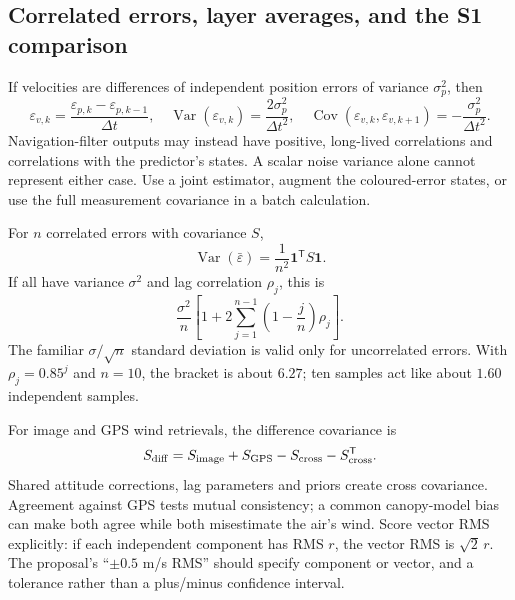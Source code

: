 \documentclass[11pt,a4paper]{article}
\numberwithin{equation}{section}
\begin{document}
\subsection{Correlated errors, layer averages, and the S1 comparison}
If velocities are differences of independent position errors of variance $\sigma_p^2$, then
\begin{equation}
 \varepsilon_{v,k}=\frac{\varepsilon_{p,k}-\varepsilon_{p,k-1}}{\Delta t},\quad
 \operatorname{Var}(\varepsilon_{v,k})=\frac{2\sigma_p^2}{\Delta t^2},\quad
 \operatorname{Cov}(\varepsilon_{v,k},\varepsilon_{v,k+1})=-\frac{\sigma_p^2}{\Delta t^2}.
\end{equation}
Navigation-filter outputs may instead have positive, long-lived correlations and correlations with the predictor's states. A scalar noise variance alone cannot represent either case. Use a joint estimator, augment the coloured-error states, or use the full measurement covariance in a batch calculation.

For $n$ correlated errors with covariance $S$,
\begin{equation}
 \operatorname{Var}(\bar\varepsilon)=\frac1{n^2}\mathbf1^{\mathsf T}S\mathbf1.
\end{equation}
If all have variance $\sigma^2$ and lag correlation $\rho_j$, this is
\begin{equation}
 \frac{\sigma^2}{n}\left[1+2\sum_{j=1}^{n-1}\left(1-\frac jn\right)\rho_j\right].
\end{equation}
The familiar $\sigma/\sqrt n$ standard deviation is valid only for uncorrelated errors. With $\rho_j=0.85^j$ and $n=10$, the bracket is about $6.27$; ten samples act like about $1.60$ independent samples.

For image and GPS wind retrievals, the difference covariance is
\begin{equation}
 S_{\rm diff}=S_{\rm image}+S_{\rm GPS}-S_{\rm cross}-S_{\rm cross}^{\mathsf T}.
\end{equation}
Shared attitude corrections, lag parameters and priors create cross covariance. Agreement against GPS tests mutual consistency; a common canopy-model bias can make both agree while both misestimate the air's wind. Score vector RMS explicitly: if each independent component has RMS $r$, the vector RMS is $\sqrt2\,r$. The proposal's ``$\pm0.5$ m/s RMS'' should specify component or vector, and a tolerance rather than a plus/minus confidence interval.
\end{document}
